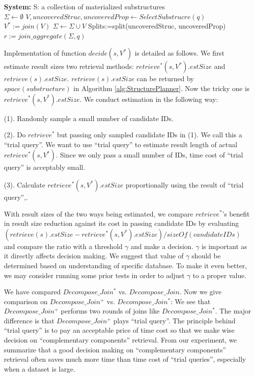 \begin{algorithm}[H]
\caption{$Decompose\_Join^{+}$}
\LinesNumbered
\textbf{System:} S: a collection of materialized substructures\\
$\Sigma \gets \emptyset $\;
$V, uncoveredStruc, uncoveredProp \gets SelectSubstrucre(q) $\;
$V^{*}:=join(V)$\;
$\Sigma \gets \Sigma \cup V $\;
Splits:=split(uncoveredStruc, uncoveredProp)\;
$r := join\_aggregate(\Sigma, q)$\;
\end{algorithm}

Implementation of function $decide(s,V^{*})$ is detailed as follows. We first estimate result sizes two retrieval methods: $retrieve^{*}(s, V^{*}).estSize$ and $retrieve(s).estSize$. $retrieve(s).estSize$ can be returned by $space(substructure)$ in Algorithm \ref{alg:StructurePlanner}. Now the tricky one is $retrieve^{*}(s, V^{*}).estSize$. We conduct estimation in the following way:

(1). Randomly sample a small number of candidate IDs.

(2). Do $retrieve^{*}$ but passing only sampled candidate IDs in (1). We call this a ``trial query''. We want to use ``trial query'' to estimate result length of actual $retrieve^{*}(s, V^{*})$. Since we only pass a small number of IDs, time cost of ``trial query'' is acceptably small.

(3). Calculate $retrieve^{*}(s, V^{*}).estSize$ proportionally using the result of ``trial query'',.
\par
With result sizes of the two ways being estimated, we compare $retrieve^{*}$'s benefit in result size reduction against its cost in passing candidate IDs by evaluating $(retrieve(s).estSize - retrieve^{*}(s, V^{*}).estSize) / sizeOf(candidateIDs)$ and compare the ratio with a threshold $\gamma$ and make a decision. $\gamma$ is important as it directly affects decision making. We suggest that value of $\gamma$ should be determined based on understanding of specific database. To make it even better, we may consider running some prior tests in order to adjust $\gamma$ to a proper value.

We have compared $Decompose\_Join^{*}$ vs.  $Decompose\_Join$. Now we give comparison on $Decompose\_Join^{+}$ vs. $Decompose\_Join^{*}$: We see that $Decompose\_Join^{+}$ performs two rounds of joins like $Decompose\_Join^{*}$. The major difference is that $Decompose\_Join^{+}$ plays ``trial query''. The principle behind ``trial query'' is to pay an acceptable price of time cost so that we make wise decision on ``complementary components'' retrieval. From our experiment, we summarize that a good decision making on ``complementary components'' retrieval often saves much more time than time cost of ``trial queries'', especially when a dataset is large.




